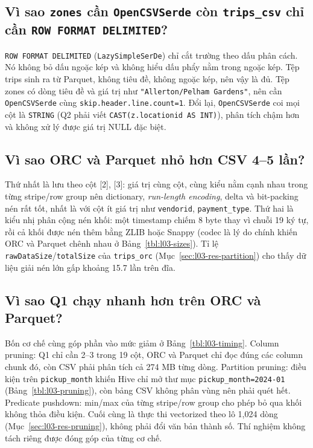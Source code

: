 \documentclass[
  12pt,
  a4paper,
]{report}
\begin{document}
\subsection{\texorpdfstring{Vì sao \texttt{zones} cần
\texttt{OpenCSVSerde} còn \texttt{trips\_csv} chỉ cần
\texttt{ROW\ FORMAT\ DELIMITED}\allowbreak{}?}{Vì sao zones cần OpenCSVSerde còn trips\_csv chỉ cần ROW FORMAT DELIMITED?}}\label{sec:l03-q2}

\texttt{ROW\ FORMAT\ DELIMITED}\allowbreak{} (\texttt{LazySimpleSerDe})
chỉ cắt trường theo dấu phân cách. Nó không bỏ dấu ngoặc kép và không
hiểu dấu phẩy nằm trong ngoặc kép. Tệp trips sinh ra từ Parquet, không
tiêu đề, không ngoặc kép, nên vậy là đủ. Tệp zones có dòng tiêu đề và
giá trị như
\texttt{"Allerton/}\allowbreak{}\texttt{Pelham\ Gardens"}\allowbreak{},
nên cần \texttt{OpenCSVSerde} cùng
\texttt{skip.}\allowbreak{}\texttt{header.}\allowbreak{}\texttt{line.}\allowbreak{}\texttt{count=}\allowbreak{}\texttt{1}\allowbreak{}.
Đổi lại, \texttt{OpenCSVSerde} coi mọi cột là \texttt{STRING} (Q2 phải
viết
\texttt{CAST(z.}\allowbreak{}\texttt{locationid\ AS\ INT)}\allowbreak{}),
phân tích chậm hơn và không xử lý được giá trị NULL đặc biệt.

\subsection{Vì sao ORC và Parquet nhỏ hơn CSV 4--5
lần?}\label{sec:l03-q3}

Thứ nhất là lưu theo cột {[}2{]}, {[}3{]}: giá trị cùng cột, cùng kiểu
nằm cạnh nhau trong từng stripe/row group nên dictionary,
\emph{run-length encoding}, delta và bit-packing nén rất tốt, nhất là
với cột ít giá trị như \texttt{vendorid}, \texttt{payment\_type}. Thứ
hai là kiểu nhị phân cộng nén khối: một timestamp chiếm 8 byte thay vì
chuỗi 19 ký tự, rồi cả khối được nén thêm bằng ZLIB hoặc Snappy (codec
là lý do chính khiến ORC và Parquet chênh nhau ở
Bảng~\ref{tbl:l03-sizes}). Tỉ lệ \texttt{rawDataSize}/\texttt{totalSize}
của \texttt{trips\_orc} (Mục~\ref{sec:l03-res-partition}) cho thấy dữ
liệu giải nén lớn gấp khoảng 15.7 lần trên đĩa.

\subsection{Vì sao Q1 chạy nhanh hơn trên ORC và
Parquet?}\label{sec:l03-q4}

Bốn cơ chế cùng góp phần vào mức giảm ở Bảng~\ref{tbl:l03-timing}.
Column pruning: Q1 chỉ cần 2--3 trong 19 cột, ORC và Parquet chỉ đọc
đúng các column chunk đó, còn CSV phải phân tích cả 274 MB từng dòng.
Partition pruning: điều kiện trên \texttt{pickup\_month} khiến Hive chỉ
mở thư mục
\texttt{pickup\_}\allowbreak{}\texttt{month=}\allowbreak{}\texttt{2024-01}\allowbreak{}
(Bảng~\ref{tbl:l03-pruning}), còn bảng CSV không phân vùng nên phải quét
hết. Predicate pushdown: min/max của từng stripe/row group cho phép bỏ
qua khối không thỏa điều kiện. Cuối cùng là thực thi vectorized theo lô
1,024 dòng (Mục~\ref{sec:l03-res-pruning}), không phải đổi văn bản thành
số. Thí nghiệm không tách riêng được đóng góp của từng cơ chế.
\end{document}
